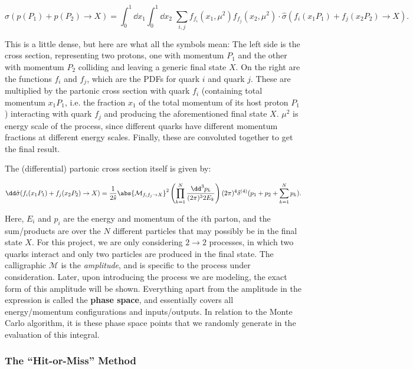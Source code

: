 \begin{equation}
  \sigma(p(P_1) + p(P_2) \rightarrow X) = \int_0^1 \dd x_1 \int_0^1 \dd x_2 \; \sum_{i,j} f_{f_i}(x_1, \mu^2) f_{f_j}(x_2, \mu^2) \cdot \hat{\sigma}(f_i(x_1 P_1) + f_j(x_2 P_2) \rightarrow X).\label{eq:cross-section}
\end{equation}

This is a little dense, but here are what all the symbols mean: The left side is the cross section, representing two protons, one with momentum $P_1$ and the other with momentum $P_2$ colliding and leaving a generic final state $X$. On the right are the functions $f_i$ and $f_j$, which are the PDFs for quark $i$ and quark $j$. These are multiplied by the partonic cross section with quark $f_i$ (containing total momentum $x_1 P_1$, i.e. the fraction $x_1$ of the total momentum of its host proton $P_1$) interacting with quark $f_j$ and producing the aforementioned final state $X$. $\mu^2$ is energy scale of the process, since different quarks have different momentum fractions at different energy scales. Finally, these are convoluted together to get the final result.

The (differential) partonic cross section itself is given by:

\begin{equation}
  \dd\hat{\sigma}(f_i(x_1 P_1) + f_j(x_2 P_2) \rightarrow X) = \frac{1}{2\hat{s}} \abs{\mathcal{M}_{f_if_j \rightarrow X}}^2 \left( \prod_{k=1}^{N} \frac{\dd^3 p_k}{(2\pi)^3 2E_k} \right) (2\pi)^4 \delta^{(4)}(p_1 + p_2 + \sum_{k=1}^{N} p_k).
\end{equation}

Here, $E_i$ and $p_i$ are the energy and momentum of the $i$th parton, and the sum/products are over the $N$ different particles that may possibly be in the final state $X$. For this project, we are only considering $2\rightarrow2$ processes, in which two quarks interact and only two particles are produced in the final state. The calligraphic $\mathcal{M}$ is the \textit{amplitude}, and is specific to the process under consideration. Later, upon introducing the process we are modeling, the exact form of this amplitude will be shown. Everything apart from the amplitude in the expression is called the \textbf{phase space}, and essentially covers all energy/momentum configurations and inputs/outputs. In relation to the Monte Carlo algorithm, it is these phase space points that we randomly generate in the evaluation of this integral.


\subsubsection{The ``Hit-or-Miss'' Method}\label{sec:2-hit-or-miss}

